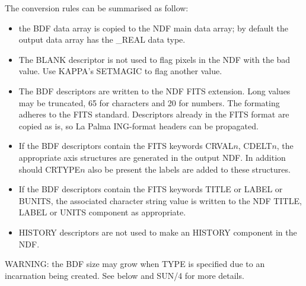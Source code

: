 {{{         \sstitem
         The conversion rules can be summarised as follow:
         \begin{itemize}
            \item the BDF data array is copied to the NDF main data array;
            by default the output data array has the \_REAL data type.
            \item The BLANK descriptor is not used to flag pixels in the NDF
            with the bad value.  Use KAPPA's SETMAGIC to flag another
            value.
            \item The BDF descriptors are written to the NDF FITS extension.
            Long values may be truncated, 65 for characters and 20 for
            numbers.  The formating adheres to the FITS standard.
            Descriptors already in the FITS format are copied as is, so
            La Palma ING-format headers can be propagated.
            \item If the BDF descriptors contain the FITS keywords CRVAL$n$,
            CDELT$n$, the appropriate axis structures are generated in
            the output NDF. In addition should CRTYPE$n$ also be present
            the labels are added to these structures.
            \item If the BDF descriptors contain the FITS keywords TITLE or
            LABEL or BUNITS, the associated character string value is
            written to the NDF TITLE, LABEL or UNITS component as
            appropriate.
            \item HISTORY descriptors are not used to make an HISTORY
            component in the NDF.
         \end{itemize}

         \sstitem
         WARNING: the BDF size may grow when TYPE is specified due to
         an incarnation being created.  See below and SUN/4 for more
         details.
      }
   }
   }
